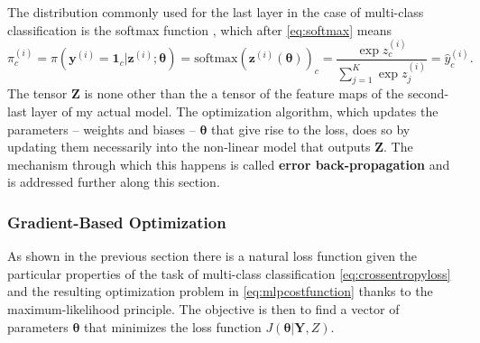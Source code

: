 The distribution commonly used for the last layer in the case of multi-class classification is the softmax function \citep{Goodfellow2016}, which after \cref{eq:softmax} means
\begin{equation}
    \pi_{c}^{(i)} = \pi(\textbf{y}^{(i)} = \bm{1}_c | \bm{z}^{(i)}; \bm{\theta}) = \text{softmax}(\bm{z}^{(i)}(\bm{\theta}))_c = \dfrac{\exp{z_c^{(i)}}}{\sum_{j=1}^K \exp{z_j^{(i)}}} = \hat{y}_c^{(i)}.
\end{equation}
The tensor $\bm{Z}$ is none other than the a tensor of the feature maps of the second-last layer of my actual model. The optimization algorithm, which updates the parameters -- weights and biases -- $\bm{\theta}$ that give rise to the loss, does so by updating them necessarily into the non-linear model that outputs $\bm{Z}$. The mechanism through which this happens is called \textbf{error back-propagation} and is addressed further along this section.
\subsubsection{Gradient-Based Optimization}
As shown in the previous section there is a natural loss function given the particular properties of the task of multi-class classification \cref{eq:crossentropyloss} and the resulting optimization problem in \cref{eq:mlpcostfunction} thanks to the maximum-likelihood principle. The objective is then to find a vector of parameters $\bm{\theta}$ that minimizes the loss function $J(\bm{\theta}|\bm{Y},{Z})$.

